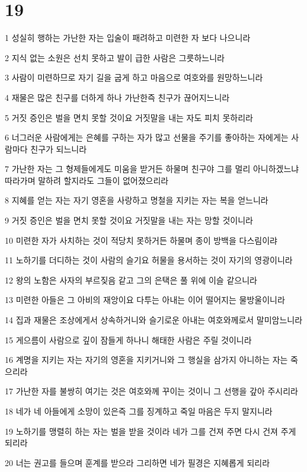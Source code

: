 \chapter{19}

\par 1 성실히 행하는 가난한 자는 입술이 패려하고 미련한 자 보다 나으니라
\par 2 지식 없는 소원은 선치 못하고 발이 급한 사람은 그릇하느니라
\par 3 사람이 미련하므로 자기 길을 굽게 하고 마음으로 여호와를 원망하느니라
\par 4 재물은 많은 친구를 더하게 하나 가난한즉 친구가 끊어지느니라
\par 5 거짓 증인은 벌을 면치 못할 것이요 거짓말을 내는 자도 피치 못하리라
\par 6 너그러운 사람에게는 은혜를 구하는 자가 많고 선물을 주기를 좋아하는 자에게는 사람마다 친구가 되느니라
\par 7 가난한 자는 그 형제들에게도 미움을 받거든 하물며 친구야 그를 멀리 아니하겠느냐 따라가며 말하려 할지라도 그들이 없어졌으리라
\par 8 지혜를 얻는 자는 자기 영혼을 사랑하고 명철을 지키는 자는 복을 얻느니라
\par 9 거짓 증인은 벌을 면치 못할 것이요 거짓말을 내는 자는 망할 것이니라
\par 10 미련한 자가 사치하는 것이 적당치 못하거든 하물며 종이 방백을 다스림이랴
\par 11 노하기를 더디하는 것이 사람의 슬기요 허물을 용서하는 것이 자기의 영광이니라
\par 12 왕의 노함은 사자의 부르짖음 같고 그의 은택은 풀 위에 이슬 같으니라
\par 13 미련한 아들은 그 아비의 재앙이요 다투는 아내는 이어 떨어지는 물방울이니라
\par 14 집과 재물은 조상에게서 상속하거니와 슬기로운 아내는 여호와께로서 말미암느니라
\par 15 게으름이 사람으로 깊이 잠들게 하나니 해태한 사람은 주릴 것이니라
\par 16 계명을 지키는 자는 자기의 영혼을 지키거니와 그 행실을 삼가지 아니하는 자는 죽으리라
\par 17 가난한 자를 불쌍히 여기는 것은 여호와께 꾸이는 것이니 그 선행을 갚아 주시리라
\par 18 네가 네 아들에게 소망이 있은즉 그를 징계하고 죽일 마음은 두지 말지니라
\par 19 노하기를 맹렬히 하는 자는 벌을 받을 것이라 네가 그를 건져 주면 다시 건져 주게 되리라
\par 20 너는 권고를 들으며 훈계를 받으라 그리하면 네가 필경은 지혜롭게 되리라
